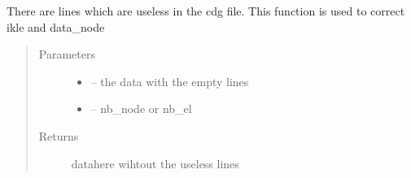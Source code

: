 \documentclass[letterpaper,10pt,english]{sphinxmanual}
\begin{document}
\begin{fulllineitems}
\label{\detokenize{index:src.river2d.get_rid_of_lines}}
There are lines which are useless in the cdg file. This function is used to correct ikle and data\_node
\begin{quote}\begin{description}
\item[{Parameters}] \leavevmode\begin{itemize}
\item {} 
 -- the data with the empty lines

\item {} 
 -- nb\_node or nb\_el

\end{itemize}

\item[{Returns}] \leavevmode
datahere wihtout the useless lines

\end{description}\end{quote}

\end{fulllineitems}

\end{document}
